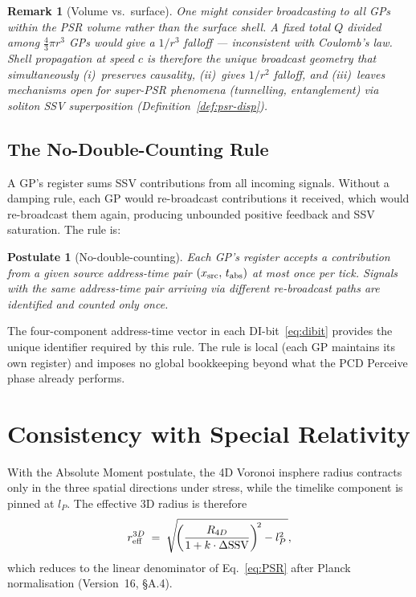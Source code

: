 \documentclass[12pt]{article}
\newtheorem{postulate}[theorem]{Postulate}
\newtheorem{remark}[theorem]{Remark}
\begin{document}
\begin{remark}[Volume vs.\ surface]
One might consider broadcasting to all GPs within the PSR \emph{volume}
rather than the surface shell.  A fixed total $Q$ divided among
$\tfrac{4}{3}\pi r^3$ GPs would give a $1/r^3$ falloff --- inconsistent
with Coulomb's law.  Shell propagation at speed $c$ is therefore the unique
broadcast geometry that simultaneously (i)~preserves causality, (ii)~gives
$1/r^2$ falloff, and (iii)~leaves mechanisms open for super-PSR phenomena
(tunnelling, entanglement) via soliton SSV superposition
(Definition~\ref{def:psr-disp}).
\end{remark}

\subsection{The No-Double-Counting Rule}

A GP's register sums SSV contributions from all incoming signals.  Without a
damping rule, each GP would re-broadcast contributions it received, which
would re-broadcast them again, producing unbounded positive feedback and SSV
saturation.  The rule is:

\begin{postulate}[No-double-counting]
Each GP's register accepts a contribution from a given source address-time
pair $(x_{\rm src},\, t_{\rm abs})$ at most \emph{once} per tick.  Signals
with the same address-time pair arriving via different re-broadcast paths are
identified and counted only once.
\end{postulate}

The four-component address-time vector in each DI-bit~\eqref{eq:dibit}
provides the unique identifier required by this rule.  The rule is local
(each GP maintains its own register) and imposes no global bookkeeping beyond
what the PCD Perceive phase already performs.

\section{Consistency with Special Relativity}
\label{sec:sr}

With the Absolute Moment postulate, the 4D Voronoi insphere radius contracts
only in the three spatial directions under stress, while the timelike
component is pinned at $l_P$.  The effective 3D radius is therefore
\begin{equation}
  r_{\rm eff}^{3D}
  \;=\; \sqrt{\!\left(\frac{R_{4D}}{1+k\cdot\Delta\text{SSV}}\right)^{\!2}
              - l_P^2\,},
\end{equation}
which reduces to the linear denominator of Eq.~\eqref{eq:PSR} after Planck
normalisation (Version~16, \S A.4).
\end{document}
